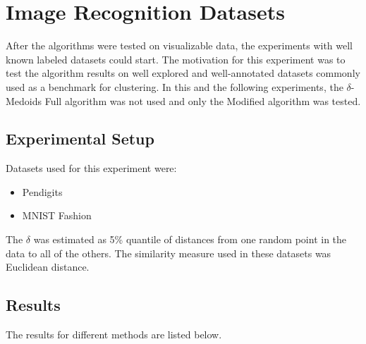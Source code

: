 \documentclass[thesis=B,english]{FITthesis}[2012/10/20]
\begin{document}
\section{Image Recognition Datasets}\label{sec:exp3}

After the algorithms were tested on visualizable data, the experiments with well known labeled datasets could start.
The motivation for this experiment was to test the algorithm results on well explored and well-annotated datasets commonly used as a benchmark for clustering.
In this and the following experiments, the $\delta$-Medoids Full algorithm was not used and only the Modified algorithm was tested.

\subsection{Experimental Setup}
Datasets used for this experiment were:
\begin{itemize}
    \item Pendigits
    \item MNIST Fashion
\end{itemize}

The $\delta$ was estimated as 5\% quantile of distances from one random point in the data to all of the others.
The similarity measure used in these datasets was Euclidean distance.

\subsection{Results}

The results for different methods are listed below.
\end{document}
